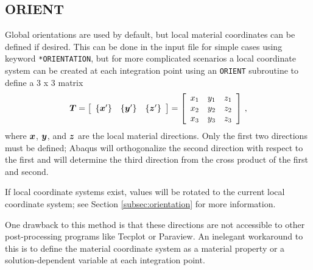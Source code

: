 \documentclass[10pt,letterpaper,oneside]{report}
\newcommand{\ten}[1]{\mbox{\boldmath $#1$}{}}
\begin{document}
\subsection{ORIENT}
Global orientations are used by default, but local material coordinates can be defined if desired.  This can be done in the input file for simple cases using keyword \texttt{*ORIENTATION}, but for more complicated scenarios a local coordinate system can be created at each integration point using an \texttt{ORIENT} subroutine to define a 3 x 3 matrix 
\begin{equation}
\ten{T} = \left[ \begin{array}{ccc} 
\{ \ten{x}' \} & \{ \ten{y}' \} & \{ \ten{z}' \}  
\end{array} \right]
= \left[ \begin{array}{ccc} 
x_1 & y_1 & z_1 \\
x_2 & y_2 & z_2 \\
x_3 & y_3 & z_3 
\end{array} \right] \, ,
\end{equation}
where $\ten{x}$, $\ten{y}$, and $\ten{z}$ are the local material directions.  Only the first two directions must be defined; Abaqus will orthogonalize the second direction with respect to the first and will determine the third direction from the cross product of the first and second.  

If local coordinate systems exist, values will be rotated to the current local coordinate system; see Section \ref{subsec:orientation} for more information.  

One drawback to this method is that these directions are not accessible to other post-processing programs like Tecplot or Paraview.  An inelegant workaround to this is to define the material coordinate system as a material property or a solution-dependent variable at each integration point. 



\end{document}
